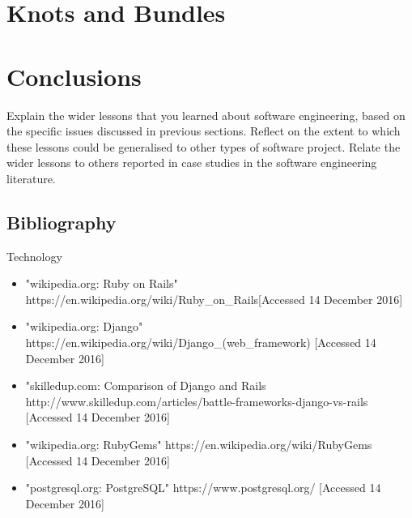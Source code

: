 \documentclass{l3proj}
\begin{document}
\section{Knots and Bundles}
\label{sec:managing}


\section{Conclusions}

Explain the wider lessons that you learned about software engineering,
based on the specific issues discussed in previous sections.  Reflect
on the extent to which these lessons could be generalised to other
types of software project.  Relate the wider lessons to others
reported in case studies in the software engineering literature.



\subsection{Bibliography}
\label{Bibliography}


\label{tech}
Technology
\begin{itemize}

\item "wikipedia.org: Ruby on Rails"
\newline https://en.wikipedia.org/wiki/Ruby\_on\_Rails[Accessed 14 December 2016]

\item "wikipedia.org: Django"
\newline https://en.wikipedia.org/wiki/Django\_(web\_framework) [Accessed 14 December 2016]

\item "skilledup.com: Comparison of Django and Rails
\newline http://www.skilledup.com/articles/battle-frameworks-django-vs-rails [Accessed 14 December 2016]

\item "wikipedia.org: RubyGems"
\newline https://en.wikipedia.org/wiki/RubyGems [Accessed 14 December 2016]

\item "postgresql.org: PostgreSQL"
\newline https://www.postgresql.org/ [Accessed 14 December 2016]


\end{itemize}
\end{document}

